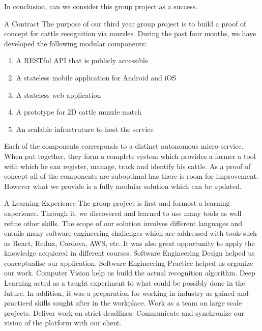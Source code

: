 In conclusion, can we consider this group project as a success.
\begin{subsection}{A Contract}
  The purpose of our third year group project is to build a proof of concept for cattle recognition via muzzles. During the past four months, we have developed the following modular components:
  \begin{enumerate}
    \item A RESTful API that is publicly accessible
    \item A stateless mobile application for Android and iOS
    \item A stateless web application
    \item A prototype for 2D cattle muzzle match
    \item An scalable infrastruture to host the service
  \end{enumerate}
  Each of the components corresponds to a distinct autonomous micro-service. When put together, they form a complete system which provides a farmer a tool with which he can register, manage, track and identify his cattle. As a proof of concept all of the components are suboptimal has there is room for improvement. However what we provide is a fully modular solution which can be updated.
\end{subsection}

\begin{subsection}{A Learning Experience}
  The group project is first and formost a learning experience. Through it, we discovered and learned to use many tools as well refine other skills. The scope of our solution involves different languages and entails many software engineering challenges which are addressed with tools such as React, Redux, Cordova, AWS, etc. It was also great opportunity to apply the knowledge acquiered in different courses. Software Engineering Design helped us conceptualise our application. Software Engineering Practice helped us organize our work. Computer Vision help us build the actual recognition algorithm. Deep Learning acted as a taught experiment to what could be possibly done in the future. In addition, it was a preparation for working in industry as gained and practiced skills sought after in the workplace. Work as a team on large scale projects. Deliver work on strict deadlines. Communicate and synchronize our vision of the platform with our client.
\end{subsection}
